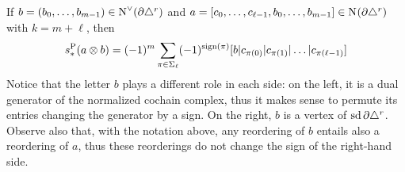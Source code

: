 If $b = (b_0,\dots,b_{m-1})\in \operatorname{N}^\vee_{}(\partial\triangle^{r})$ and $a = [c_0,\dots,c_{\ell-1},b_0,\dots,b_{m-1}]\in \operatorname{N}_{}(\partial\triangle^{r})$ with $k = m+\ell$, then
	\begin{equation}\label{eq:sP}
		s_*^{{\operatorname{P}}}( a\otimes b) = (-1)^{m} \sum_{\pi\in \Sigma_{\ell}} (-1)^{\operatorname{sign}(\pi)} [b|c_{\pi(0)}|c_{\pi(1)}|\dots|c_{\pi(\ell-1)}]
	\end{equation}
Notice that the letter $b$ plays a different role in each side: on the left, it is a dual generator of the normalized cochain complex, thus it makes sense to permute its entries changing the generator by a sign. On the right, $b$ is a vertex of $\operatorname{sd}\partial\triangle^{r}$. Observe also that, with the notation above, any reordering of $b$ entails also a reordering of $a$, thus these reorderings do not change the sign of the right-hand side.

